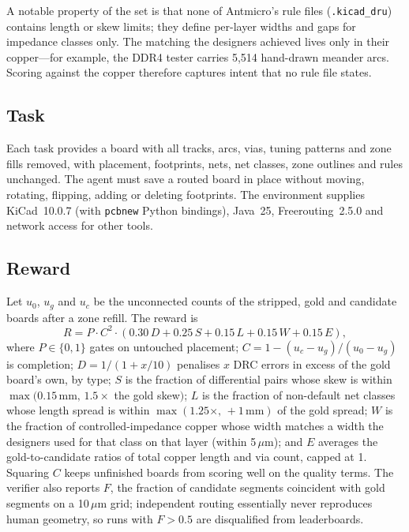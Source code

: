 \documentclass[11pt]{article}
\begin{document}
\begin{table}[t]
\centering\small
\boardtable
\caption{The gold-master set. \emph{To route}: unconnected connections after stripping, from KiCad's connectivity engine. Tiers reflect layer count, size and interface difficulty.}
\label{tab:boards}
\end{table}

A notable property of the set is that none of Antmicro's rule files (\texttt{.kicad\_dru}) contains length or skew limits; they define per-layer widths and gaps for impedance classes only. The matching the designers achieved lives only in their copper---for example, the DDR4 tester carries 5,514 hand-drawn meander arcs. Scoring against the copper therefore captures intent that no rule file states.

\subsection{Task}
Each task provides a board with all tracks, arcs, vias, tuning patterns and zone fills removed, with placement, footprints, nets, net classes, zone outlines and rules unchanged. The agent must save a routed board in place without moving, rotating, flipping, adding or deleting footprints. The environment supplies KiCad~10.0.7 (with \texttt{pcbnew} Python bindings), Java~25, Freerouting~2.5.0 \citep{freerouting} and network access for other tools.

\subsection{Reward}
Let $u_0$, $u_g$ and $u_c$ be the unconnected counts of the stripped, gold and candidate boards after a zone refill. The reward is
\begin{equation}
R = P \cdot C^2 \cdot \left(0.30\,D + 0.25\,S + 0.15\,L + 0.15\,W + 0.15\,E\right),
\end{equation}
where $P\in\{0,1\}$ gates on untouched placement; $C = 1-(u_c-u_g)/(u_0-u_g)$ is completion; $D = 1/(1+x/10)$ penalises $x$ DRC errors in excess of the gold board's own, by type; $S$ is the fraction of differential pairs whose skew is within $\max(0.15\,\text{mm},\,1.5\times$ the gold skew$)$; $L$ is the fraction of non-default net classes whose length spread is within $\max(1.25\times,\,+1\,\text{mm})$ of the gold spread; $W$ is the fraction of controlled-impedance copper whose width matches a width the designers used for that class on that layer (within 5\,$\mu$m); and $E$ averages the gold-to-candidate ratios of total copper length and via count, capped at 1. Squaring $C$ keeps unfinished boards from scoring well on the quality terms. The verifier also reports $F$, the fraction of candidate segments coincident with gold segments on a 10\,$\mu$m grid; independent routing essentially never reproduces human geometry, so runs with $F>0.5$ are disqualified from leaderboards.
\end{document}
